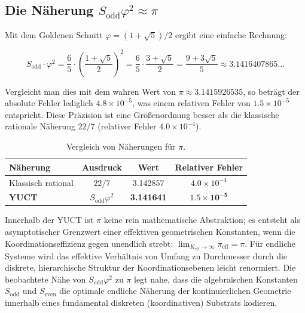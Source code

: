 \documentclass[11pt,a4paper]{article}
\theoremstyle{remark}
\begin{document}
	\subsection{Die Näherung \(S_{\mathrm{odd}} \varphi^2 \approx \pi\)}
	
	Mit dem Goldenen Schnitt \(\varphi = (1+\sqrt{5})/2\) ergibt eine einfache Rechnung:
	
	\begin{equation}
		S_{\mathrm{odd}} \cdot \varphi^2 = \frac{6}{5} \cdot \left(\frac{1+\sqrt{5}}{2}\right)^2 
		= \frac{6}{5} \cdot \frac{3+\sqrt{5}}{2} 
		= \frac{9 + 3\sqrt{5}}{5} \approx 3.1416407865\dots
	\end{equation}
	
	Vergleicht man dies mit dem wahren Wert von \(\pi \approx 3.1415926535\), so beträgt der absolute Fehler lediglich \(4.8 \times 10^{-5}\), was einem relativen Fehler von \(1.5 \times 10^{-5}\) entspricht. Diese Präzision ist eine Größenordnung besser als die klassische rationale Näherung \(22/7\) (relativer Fehler \(4.0 \times 10^{-4}\)).
	
	\begin{table}[htbp]
		\centering
		\caption{Vergleich von Näherungen für \(\pi\).}
		\label{tab:pi_approx}
		\begin{tabular}{lccc}
			\toprule
			\textbf{Näherung} & \textbf{Ausdruck} & \textbf{Wert} & \textbf{Relativer Fehler} \\
			\midrule
			Klassisch rational & \(22/7\) & 3.142857 & \(4.0 \times 10^{-4}\) \\
			\textbf{YUCT} & \(S_{\mathrm{odd}}\varphi^2\) & \textbf{3.141641} & \(\mathbf{1.5 \times 10^{-5}}\) \\
			\bottomrule
		\end{tabular}
	\end{table}
	
	Innerhalb der YUCT ist \(\pi\) keine rein mathematische Abstraktion; es entsteht als asymptotischer Grenzwert einer effektiven geometrischen Konstanten, wenn die Koordinationseffizienz gegen unendlich strebt: \(\lim_{K_{\mathrm{eff}} \to \infty} \pi_{\mathrm{eff}} = \pi\). Für endliche Systeme wird das effektive Verhältnis von Umfang zu Durchmesser durch die diskrete, hierarchische Struktur der Koordinationsebenen leicht renormiert. Die beobachtete Nähe von \(S_{\mathrm{odd}}\varphi^2\) zu \(\pi\) legt nahe, dass die algebraischen Konstanten \(S_{\mathrm{odd}}\) und \(S_{\mathrm{even}}\) die optimale endliche Näherung der kontinuierlichen Geometrie innerhalb eines fundamental diskreten (koordinativen) Substrats kodieren.
	
\end{document}
